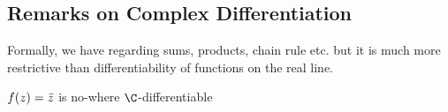 \subsection{Remarks on Complex Differentiation}
\begin{remark}
Formally, we have regarding sums, products, chain rule etc. but it is much more restrictive than differentiability of functions on the real line.
\end{remark}
\begin{example}
$f(z) = \Bar{z}$ is no-where $\C$-differentiable\\



\begin{tikzpicture}[x=0.75pt,y=0.75pt,yscale=-1,xscale=1]


\end{tikzpicture}
\end{example}

